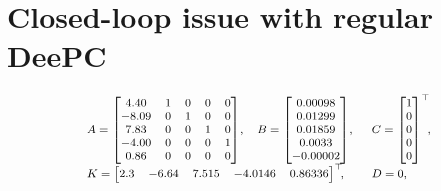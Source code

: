 \section{Closed-loop issue with regular \ac{DeePC}}\label{sec:CL_ID_issue}

\begin{align}\label{eq:SysFavoreel}
\scriptsize
\begin{array}{lll}
    A = \begin{bmatrix}
        4.40 & 1 & 0 & 0 & 0\\
       -8.09 & 0 & 1 & 0 & 0\\
        7.83 & 0 & 0 & 1 & 0\\
       -4.00 & 0 & 0 & 0 & 1\\
        0.86 & 0 & 0 & 0 & 0
    \end{bmatrix}\!,&
    B = \begin{bmatrix}
        0.00098\\
        0.01299\\
        0.01859\\
        0.0033\\
       -0.00002
    \end{bmatrix}\!,&C = \begin{bmatrix}
        1 \\ 0 \\ 0\\ 0\\ 0
    \end{bmatrix}^\top\mkern-7mu,\\
    K = \begin{bmatrix}
        2.3 & -6.64 & 7.515 & -4.0146 & 0.86336
    \end{bmatrix}^\top\mkern-7mu,\span
    &D=0,
\end{array}
\end{align}

